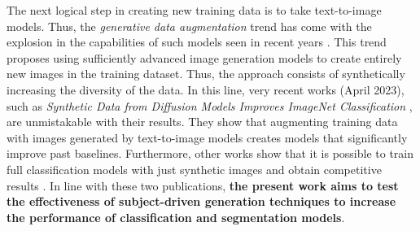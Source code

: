 The next logical step in creating new training data is to take text-to-image models. Thus, the \textit{generative data augmentation} trend has come with the explosion in the capabilities of such models seen in recent years \cite{rombach2022high, dhariwal2021diffusion}. This trend proposes using sufficiently advanced image generation models to create entirely new images in the training dataset. Thus, the approach consists of synthetically increasing the diversity of the data. In this line, very recent works (April 2023), such as \textit{Synthetic Data from Diffusion Models Improves ImageNet Classification} \cite{azizi2023synthetic}, are unmistakable with their results. They show that augmenting training data with images generated by text-to-image models creates models that significantly improve past baselines. Furthermore, other works show that it is possible to train full classification models with just synthetic images and obtain competitive results \cite{sariyildiz2023fake}. In line with these two publications, \textbf{the present work aims to test the effectiveness of subject-driven generation techniques to increase the performance of classification and segmentation models}.